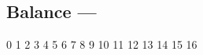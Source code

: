 \subsection[Balance]{Balance --- \UiKey{\SET}}









































0
1
2
3
4
5
6
7
8
9
10
11
12
13
14
15
16
